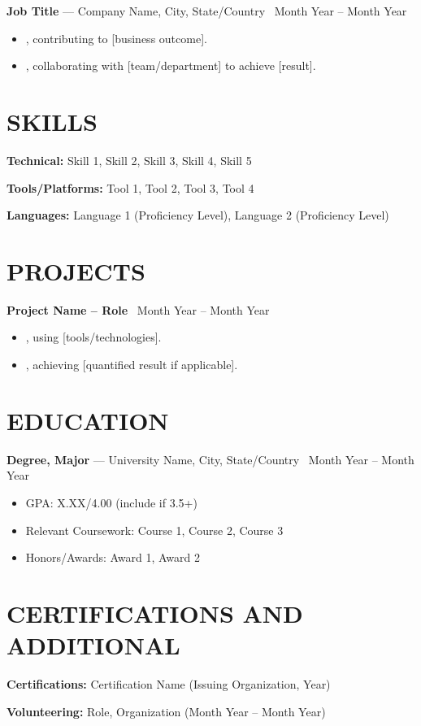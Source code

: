 \documentclass[10.5pt, letterpaper]{article}
\newcommand{\entry}[4]{%
  \noindent\textbf{#1} --- #3, #4 \textbar\ #2\par
  \vspace{2pt}
}
\newcommand{\projectentry}[2]{%
  \noindent\textbf{#1} \textbar\ #2\par
  \vspace{2pt}
}
\newcommand{\resumeItem}[1]{\item #1}
\begin{document}
\entry{Job Title}{Month Year -- Month Year}{Company Name}{City, State/Country}
\begin{itemize}
  \resumeItem{[Action verb] [task/project], contributing to [business outcome].}
  \resumeItem{[Action verb] [task/project], collaborating with [team/department] to achieve [result].}
\end{itemize}

\section{SKILLS}
\noindent\textbf{Technical:} Skill 1, Skill 2, Skill 3, Skill 4, Skill 5\par
\noindent\textbf{Tools/Platforms:} Tool 1, Tool 2, Tool 3, Tool 4\par
\noindent\textbf{Languages:} Language 1 (Proficiency Level), Language 2 (Proficiency Level)

\section{PROJECTS}

\projectentry{Project Name -- Role}{Month Year -- Month Year}
\begin{itemize}
  \resumeItem{[Action verb] [what was built/done], using [tools/technologies].}
  \resumeItem{[Action verb] [outcome/impact], achieving [quantified result if applicable].}
\end{itemize}

\section{EDUCATION}

\entry{Degree, Major}{Month Year -- Month Year}{University Name}{City, State/Country}
\begin{itemize}
  \resumeItem{GPA: X.XX/4.00 (include if 3.5+)}
  \resumeItem{Relevant Coursework: Course 1, Course 2, Course 3}
  \resumeItem{Honors/Awards: Award 1, Award 2}
\end{itemize}

\section{CERTIFICATIONS AND ADDITIONAL}
\noindent\textbf{Certifications:} Certification Name (Issuing Organization, Year)\par
\noindent\textbf{Volunteering:} Role, Organization (Month Year -- Month Year)
\end{document}
